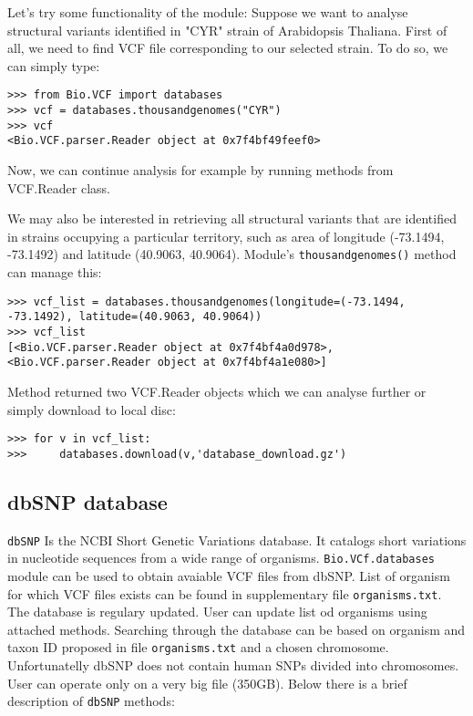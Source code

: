 \noindent Let's try some functionality of the module:
\vspace{5mm}
\noindent Suppose we want to analyse structural variants identified in "CYR" strain of Arabidopsis Thaliana. First of all,
we need to find VCF file corresponding to our selected strain. To do so, we can simply type:


\begin{verbatim}
>>> from Bio.VCF import databases
>>> vcf = databases.thousandgenomes("CYR")
>>> vcf
<Bio.VCF.parser.Reader object at 0x7f4bf49feef0>

\end{verbatim}


\noindent Now, we can continue analysis for example by running methods from VCF.Reader class.


\noindent We may also be interested in retrieving all structural variants that are identified in strains occupying a particular
territory, such as area of longitude (-73.1494, -73.1492) and latitude (40.9063, 40.9064). Module's \verb|thousandgenomes()|
method can manage this:


\begin{verbatim}
>>> vcf_list = databases.thousandgenomes(longitude=(-73.1494, -73.1492), latitude=(40.9063, 40.9064))
>>> vcf_list
[<Bio.VCF.parser.Reader object at 0x7f4bf4a0d978>, <Bio.VCF.parser.Reader object at 0x7f4bf4a1e080>]

\end{verbatim}


\noindent Method returned two VCF.Reader objects which we can analyse further or simply download to local disc:


\begin{verbatim}
>>> for v in vcf_list:
>>>     databases.download(v,'database_download.gz')
\end{verbatim}

\subsection{dbSNP database}

\verb|dbSNP| Is the NCBI Short Genetic Variations database. It catalogs short variations in nucleotide sequences from a wide range of organisms. 
\verb|Bio.VCf.databases| module can be used to obtain avaiable VCF files from dbSNP. List of organism for which VCF files exists can be found in supplementary file \verb|organisms.txt|. The database is regulary updated. User can update list od organisms using attached methods. Searching through the database can be based on organism and taxon ID proposed in file \verb|organisms.txt| and a chosen chromosome. Unfortunatelly dbSNP does not contain human SNPs divided into chromosomes. User can operate only on a very big file (350GB).
\vspace{5mm}
\noindent Below there is a brief description of \verb|dbSNP| methods:

